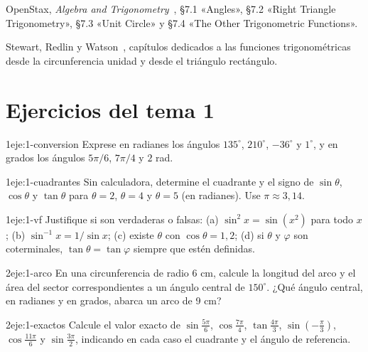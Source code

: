 \begin{lecturas}
\item OpenStax, \emph{Algebra and Trigonometry}~\cite{osat}, §7.1 «Angles», §7.2 «Right Triangle Trigonometry», §7.3 «Unit Circle» y §7.4 «The Other Trigonometric Functions».
\item Stewart, Redlin y Watson~\cite{stewart}, capítulos dedicados a las funciones trigonométricas desde la circunferencia unidad y desde el triángulo rectángulo.
\end{lecturas}

\section*{Ejercicios del tema 1}

\begin{ejercicio}{1}{eje:1-conversion}
Exprese en radianes los ángulos $135^{\circ}$, $210^{\circ}$, $-36^{\circ}$ y $1^{\circ}$, y en grados los ángulos $5\pi/6$, $7\pi/4$ y $2$ rad.
\end{ejercicio}

\begin{ejercicio}{1}{eje:1-cuadrantes}
Sin calculadora, determine el cuadrante y el signo de $\sin\theta$, $\cos\theta$ y $\tan\theta$ para $\theta=2$, $\theta=4$ y $\theta=5$ (en radianes). Use $\pi\approx 3{,}14$.
\end{ejercicio}

\begin{ejercicio}{1}{eje:1-vf}
Justifique si son verdaderas o falsas: (a) $\sin^{2}x=\sin(x^{2})$ para todo $x$; (b) $\sin^{-1}x=1/\sin x$; (c) existe $\theta$ con $\cos\theta=1{,}2$; (d) si $\theta$ y $\varphi$ son coterminales, $\tan\theta=\tan\varphi$ siempre que estén definidas.
\end{ejercicio}

\begin{ejercicio}{2}{eje:1-arco}
En una circunferencia de radio $6$ cm, calcule la longitud del arco y el área del sector correspondientes a un ángulo central de $150^{\circ}$. ¿Qué ángulo central, en radianes y en grados, abarca un arco de 9 cm?
\end{ejercicio}

\begin{ejercicio}{2}{eje:1-exactos}
Calcule el valor exacto de $\sin\frac{5\pi}{6}$, $\cos\frac{7\pi}{4}$, $\tan\frac{4\pi}{3}$, $\sin(-\frac{\pi}{3})$, $\cos\frac{11\pi}{6}$ y $\sin\frac{3\pi}{2}$, indicando en cada caso el cuadrante y el ángulo de referencia.
\end{ejercicio}

